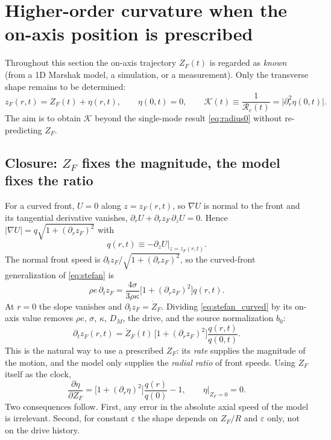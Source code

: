 \documentclass[11pt]{article}
\numberwithin{equation}{section}
\begin{document}
\section{Higher-order curvature when the on-axis position is prescribed}\label{sec:higher}
Throughout this section the on-axis trajectory $Z_F(t)$ is regarded as \emph{known} (from a 1D Marshak model, a simulation, or a measurement). Only the transverse shape remains to be determined:
\begin{equation}
z_F(r,t)=Z_F(t)+\eta(r,t),\qquad \eta(0,t)=0,\qquad
\mathcal K(t)\equiv\frac1{\mathcal R_c(t)}=\bigl|\partial_r^2\eta(0,t)\bigr|.
\end{equation}
The aim is to obtain $\mathcal K$ beyond the single-mode result \eqref{eq:radius0} without re-predicting $Z_F$.

\subsection{\texorpdfstring{Closure: $Z_F$ fixes the magnitude, the model fixes the ratio}{Closure: ZF fixes the magnitude, the model fixes the ratio}}
For a curved front, $U=0$ along $z=z_F(r,t)$, so $\nabla U$ is normal to the front and its tangential derivative vanishes, $\partial_rU+\partial_rz_F\,\partial_zU=0$. Hence $|\nabla U|=q\sqrt{1+(\partial_rz_F)^2}$ with
\begin{equation}q(r,t)\equiv-\left.\partial_zU\right|_{z=z_F(r,t)}.\end{equation}
The normal front speed is $\partial_tz_F/\sqrt{1+(\partial_rz_F)^2}$, so the curved-front generalization of \eqref{eq:stefan} is
\begin{equation}\rho e\,\partial_tz_F=\frac{4\sigma}{3\rho\kappa}\bigl[1+(\partial_rz_F)^2\bigr]q(r,t).\label{eq:stefan_curved}\end{equation}
At $r=0$ the slope vanishes and $\partial_tz_F=\dot Z_F$. Dividing \eqref{eq:stefan_curved} by its on-axis value removes $\rho e$, $\sigma$, $\kappa$, $D_M$, the drive, and the source normalization $b_0$:
\begin{equation}\boxed{\partial_tz_F(r,t)=\dot Z_F(t)\,\bigl[1+(\partial_rz_F)^2\bigr]\frac{q(r,t)}{q(0,t)}.}\label{eq:ratio}\end{equation}
This is the natural way to use a prescribed $Z_F$: its \emph{rate} supplies the magnitude of the motion, and the model only supplies the \emph{radial ratio} of front speeds. Using $Z_F$ itself as the clock,
\begin{equation}\boxed{\frac{\partial\eta}{\partial Z_F}=\bigl[1+(\partial_r\eta)^2\bigr]\frac{q(r)}{q(0)}-1,\qquad \eta\big|_{Z_F=0}=0.}\label{eq:etaZ}\end{equation}
Two consequences follow. First, any error in the absolute axial speed of the model is irrelevant. Second, for constant $\varepsilon$ the shape depends on $Z_F/R$ and $\varepsilon$ only, not on the drive history.
\end{document}
